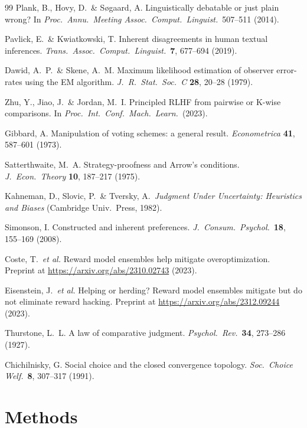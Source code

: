 \documentclass[10pt]{article}
\theoremstyle{definition}
\theoremstyle{remark}
\begin{document}
\begin{thebibliography}{99}
 Plank, B., Hovy, D.\ \& S\o{}gaard, A. Linguistically debatable or just plain wrong? In \emph{Proc.\ Annu.\ Meeting Assoc.\ Comput.\ Linguist.}\ 507--511 (2014).

 Pavlick, E.\ \& Kwiatkowski, T. Inherent disagreements in human textual inferences. \emph{Trans.\ Assoc.\ Comput.\ Linguist.}\ \textbf{7}, 677--694 (2019).

 Dawid, A.\ P.\ \& Skene, A.\ M. Maximum likelihood estimation of observer error-rates using the EM algorithm. \emph{J.\ R.\ Stat.\ Soc.\ C} \textbf{28}, 20--28 (1979).

 Zhu, Y., Jiao, J.\ \& Jordan, M.\ I. Principled RLHF from pairwise or K-wise comparisons. In \emph{Proc.\ Int.\ Conf.\ Mach.\ Learn.}\ (2023).

 Gibbard, A. Manipulation of voting schemes: a general result. \emph{Econometrica} \textbf{41}, 587--601 (1973).

 Satterthwaite, M.\ A. Strategy-proofness and Arrow's conditions. \emph{J.\ Econ.\ Theory} \textbf{10}, 187--217 (1975).

 Kahneman, D., Slovic, P.\ \& Tversky, A.\ \emph{Judgment Under Uncertainty: Heuristics and Biases} (Cambridge Univ.\ Press, 1982).

 Simonson, I. Constructed and inherent preferences. \emph{J.\ Consum.\ Psychol.}\ \textbf{18}, 155--169 (2008).

 Coste, T.\ \emph{et al.} Reward model ensembles help mitigate overoptimization. Preprint at \url{https://arxiv.org/abs/2310.02743} (2023).

 Eisenstein, J.\ \emph{et al.} Helping or herding? Reward model ensembles mitigate but do not eliminate reward hacking. Preprint at \url{https://arxiv.org/abs/2312.09244} (2023).

 Thurstone, L.\ L. A law of comparative judgment. \emph{Psychol.\ Rev.}\ \textbf{34}, 273--286 (1927).

 Chichilnisky, G. Social choice and the closed convergence topology. \emph{Soc.\ Choice Welf.}\ \textbf{8}, 307--317 (1991).

\end{thebibliography}

\clearpage

\section*{Methods}
\end{document}

